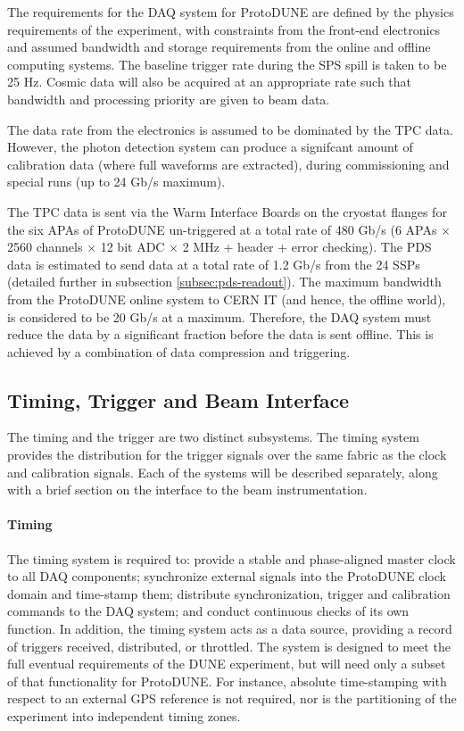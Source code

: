 The requirements for the DAQ system for ProtoDUNE are defined
by the physics requirements of the experiment, with constraints from the
front-end electronics and assumed bandwidth and storage requirements
from the online and offline computing systems.  The baseline trigger
rate during the SPS spill is taken to be 25 Hz.  Cosmic data will also
be acquired at an appropriate rate such that bandwidth and processing priority are given 
to beam data.

The data rate from the electronics is assumed to be dominated by the
TPC data.  However, the photon detection system can produce a signifcant
amount of calibration data (where full waveforms are extracted), during
commissioning and special runs (up to 24 Gb/s maximum).

The TPC data is sent via the Warm Interface Boards on the cryostat flanges
for the six APAs of ProtoDUNE un-triggered at a total rate of 480 Gb/s
(6 APAs $\times$ 2560 channels $\times$ 12 bit ADC $\times$ 2 MHz +
header + error checking).  The PDS data is estimated to send data
at a total rate of 1.2 Gb/s from the 24 SSPs (detailed further in subsection \ref{subsec:pds-readout}).
The maximum bandwidth from the ProtoDUNE online system to CERN IT (and
hence, the offline world), is considered to be 20 Gb/s at a maximum.
Therefore, the DAQ system must reduce the data by a significant fraction
before the data is sent offline.  This is achieved by a combination of
data compression and triggering.


\subsection{Timing, Trigger and Beam Interface}
\label{sec:daq_time}

The timing and the trigger are two distinct subsystems.  The timing
system provides the distribution for the trigger signals over the same
fabric as the clock and calibration signals.  Each of the systems will
be described separately, along with a brief section on the interface to
the beam instrumentation.

\paragraph{Timing}


The timing system is required to: provide a stable and phase-aligned
master clock to all DAQ components; synchronize external signals into the
ProtoDUNE clock domain and time-stamp them; distribute synchronization,
trigger and calibration commands to the DAQ system; and conduct continuous
checks of its own function. In addition, the timing system acts as a
data source, providing a record of triggers received, distributed, or
throttled. The system is designed to meet the full eventual requirements
of the DUNE experiment, but will need only a subset of that functionality
for ProtoDUNE. For instance, absolute time-stamping with respect to an
external GPS reference is not required, nor is the partitioning of the
experiment into independent timing zones.

